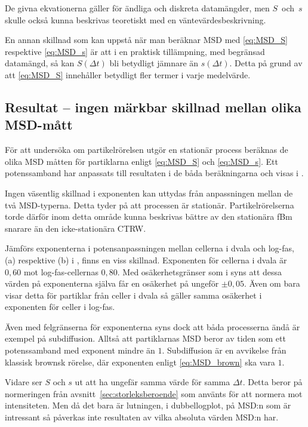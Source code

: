 De givna ekvationerna gäller för ändliga och diskreta datamängder, men $S$~och~$s$ skulle också kunna beskrivas teoretiskt med en väntevärdesbeskrivning.

En annan skillnad som kan uppstå när man beräknar MSD med \eqref{eq:MSD_S} respektive \eqref{eq:MSD_s} är att i en praktisk tillämpning, med begränsad datamängd, så kan $S(\Delta{t})$ bli betydligt jämnare än $s(\Delta{t})$. Detta på grund av att \eqref{eq:MSD_S} innehåller betydligt fler termer i varje medelvärde. 



\subsection{Resultat -- ingen märkbar skillnad mellan olika MSD-mått}


För att undersöka om partikelrörelsen utgör en stationär process beräknas de olika MSD måtten för partiklarna enligt \eqref{eq:MSD_S} och \eqref{eq:MSD_s}. Ett potenssamband har anpassats till resultaten i de båda beräkningarna och visas i . 

Ingen väsentlig skillnad i exponenten kan uttydas från anpassningen mellan de två MSD-typerna. Detta tyder på att processen är stationär. Partikelrörelserna torde därför inom detta område kunna beskrivas bättre av den stationära fBm snarare än den icke-stationära CTRW.

Jämförs exponenterna i potensanpassningen mellan cellerna i dvala och log-fas, (a) respektive (b) i , finns en viss skillnad. Exponenten för cellerna i dvala är $0,60$ mot log-fas-cellernas $0,80$. Med osäkerhetsgränser som i  syns att dessa värden på exponenterna själva får en osäkerhet på ungeför $\pm 0,05$. Även om  bara visar detta för partiklar från celler i dvala så gäller samma osäkerhet i exponenten för celler i log-fas.

Även med felgränserna för exponenterna syns dock att båda processerna ändå är exempel på subdiffusion. Alltså att partiklarnas MSD beror av tiden som ett potenssamband med exponent mindre än $1$. Subdiffusion är en avvikelse från klassisk brownsk rörelse, där exponenten enligt \eqref{eq:MSD_brown} ska vara $1$. 


Vidare ser $S$ och $s$ ut att ha ungefär samma värde för samma $\Delta{t}$. Detta beror på normeringen från avsnitt~\ref{sec:storleksberoende} som använts för att normera mot intensiteten. Men då det bara är lutningen, i dubbellogplot, på MSD:n som är intressant så påverkas inte resultaten av vilka absoluta värden MSD:n har.


